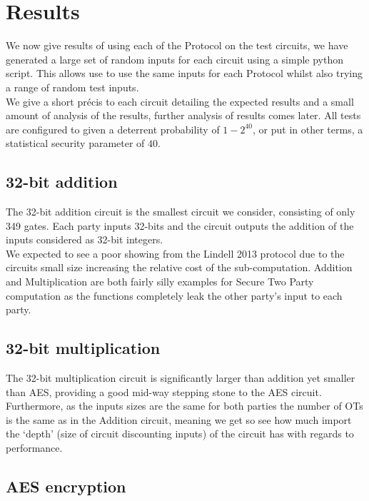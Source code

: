 \documentclass[ %
                    author={Nicholas Tutte},
                supervisor={Prof. Nigel Smart},
                    degree={MEng},
                     title={Secure Two Party Computation},
                  subtitle={A practical comparison of recent protocols},
                      type={Research - GG1K},
                      year={2015} ]{dissertation}
\begin{document}
		\section{Results}
			We now give results of using each of the Protocol on the test circuits, we have generated a large set of random inputs for each circuit using a simple python script. This allows use to use the same inputs for each Protocol whilst also trying a range of random test inputs.\\
			
			We give a short précis to each circuit detailing the expected results and a small amount of analysis of the results, further analysis of results comes later. All tests are configured to given a deterrent probability of $1 - 2^{40}$, or put in other terms, a statistical security parameter of $40$.

			\subsection{32-bit addition}
				The 32-bit addition circuit is the smallest circuit we consider, consisting of only 349 gates. Each party inputs 32-bits and the circuit outputs the addition of the inputs considered as 32-bit integers.\\

				We expected to see a poor showing from the Lindell 2013 protocol due to the circuits small size increasing the relative cost of the sub-computation. Addition and Multiplication are both fairly silly examples for Secure Two Party computation as the functions completely leak the other party's input to each party. 

			\subsection{32-bit multiplication}

				The 32-bit multiplication circuit is significantly larger than addition yet smaller than AES, providing a good mid-way stepping stone to the AES circuit. Furthermore, as the inputs sizes are the same for both parties the number of OTs is the same as in the Addition circuit, meaning we get so see how much import the `depth' (size of circuit discounting inputs) of the circuit has with regards to performance.

			\subsection{AES encryption}
\end{document}
